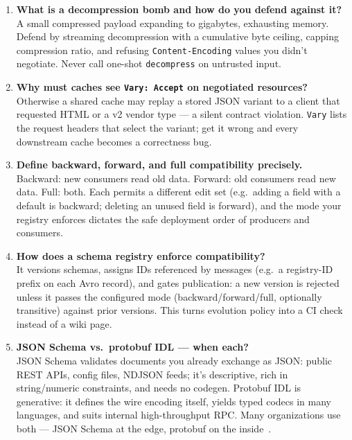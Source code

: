 \begin{enumerate}[label=\textbf{Q\arabic*.}, leftmargin=1.3cm, itemsep=0.8em]
\item \textbf{What is a decompression bomb and how do you defend against it?}\\
A small compressed payload expanding to gigabytes, exhausting memory. Defend by
streaming decompression with a cumulative byte ceiling, capping compression
ratio, and refusing \texttt{Content-Encoding} values you didn't negotiate. Never
call one-shot \texttt{decompress} on untrusted input.

\item \textbf{Why must caches see \texttt{Vary: Accept} on negotiated resources?}\\
Otherwise a shared cache may replay a stored JSON variant to a client that
requested HTML or a v2 vendor type --- a silent contract violation. \texttt{Vary}
lists the request headers that select the variant; get it wrong and every
downstream cache becomes a correctness bug.

\item \textbf{Define backward, forward, and full compatibility precisely.}\\
Backward: new consumers read old data. Forward: old consumers read new data.
Full: both. Each permits a different edit set (e.g.\ adding a field with a default
is backward; deleting an unused field is forward), and the mode your registry
enforces dictates the safe deployment order of producers and consumers.

\item \textbf{How does a schema registry enforce compatibility?}\\
It versions schemas, assigns IDs referenced by messages (e.g.\ a registry-ID
prefix on each Avro record), and gates publication: a new version is rejected
unless it passes the configured mode (backward/forward/full, optionally
transitive) against prior versions. This turns evolution policy into a CI check
instead of a wiki page.

\item \textbf{JSON Schema vs.\ protobuf IDL --- when each?}\\
JSON Schema validates documents you already exchange as JSON: public REST APIs,
config files, NDJSON feeds; it's descriptive, rich in string/numeric constraints,
and needs no codegen. Protobuf IDL is generative: it defines the wire encoding
itself, yields typed codecs in many languages, and suits internal high-throughput
RPC. Many organizations use both --- JSON Schema at the edge, protobuf on the
inside~\cite{jsonschemadocs, protobufdocs}.


\end{enumerate}
